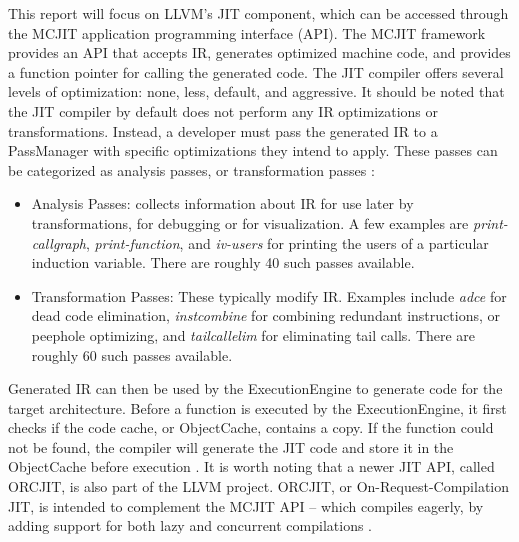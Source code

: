 This report will focus on LLVM's JIT component, which can be accessed through the MCJIT application programming interface (API).
The MCJIT framework provides an API that accepts IR, generates optimized machine code, and provides a function pointer for calling the generated code.
The JIT compiler offers several levels of optimization: none, less, default, and aggressive.
It should be noted that the JIT compiler by default does not perform any IR optimizations or transformations.
Instead, a developer must pass the generated IR to a PassManager with specific optimizations they intend to apply.
These passes can be categorized as analysis passes, or transformation passes \cite{LLVM_Passes}:
\begin{itemize}
    \item Analysis Passes: collects information about IR for use later by transformations, for debugging or for visualization. 
    A few examples are \textit{print-callgraph}, \textit{print-function}, and \textit{iv-users} for printing the users of a particular induction variable. There are roughly 40 such passes available.
    \item Transformation Passes: These typically modify IR. Examples include \textit{adce} for dead code elimination, \textit{instcombine} for combining redundant instructions, or peephole optimizing, and \textit{tailcallelim} for eliminating tail calls. There are roughly 60 such passes available.
\end{itemize}
Generated IR can then be used by the ExecutionEngine to generate code for the target architecture.
Before a function is executed by the ExecutionEngine, it first checks if the code cache, or ObjectCache, contains a copy.
If the function could not be found, the compiler will generate the JIT code and store it in the ObjectCache before execution \cite{LLVM_MCJIT}.
It is worth noting that a newer JIT API, called ORCJIT, is also part of the LLVM project.
ORCJIT, or On-Request-Compilation JIT, is intended to complement the MCJIT API -- which compiles eagerly, by adding support for both lazy and concurrent compilations \cite{LLVM_ORCJIT}.